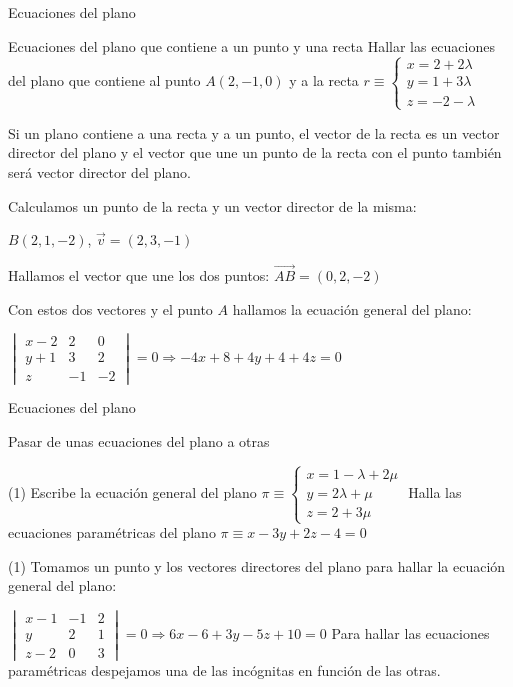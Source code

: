 \documentclass[8pt]{beamer}
\begin{document}
\begin{frame}[t]{Ecuaciones del plano}
\begin{exampleblock}{Ecuaciones del plano que contiene a un punto y una recta}
Hallar las ecuaciones del plano que contiene al punto $A(2,-1,0)$ y a la recta $r \equiv \begin{cases} x= 2 + 2 \lambda \\ y= 1+3\lambda \\ z= -2-\lambda \end{cases}$
\end{exampleblock}

Si un plano contiene a una recta y a un punto, el vector de la recta es un vector director del plano y el vector que une un punto de la recta con el punto también será vector director del plano.

Calculamos un punto de la recta y un vector director de la misma:

$B(2,1,-2)$, $\vec{v}=(2,3,-1)$

Hallamos el vector que une los dos puntos: $\vec{AB}=(0,2,-2)$

Con estos dos vectores y el punto $A$ hallamos la ecuación general del plano:

$\begin{vmatrix}
x-2 & 2 & 0 \\ y+1 & 3 & 2 \\ z & -1 & -2 
\end{vmatrix}=0 \Rightarrow -4x+8+4y+4+4z=0$
\end{frame}

\begin{frame}[t]{Ecuaciones del plano}
\begin{exampleblock}{Pasar de unas ecuaciones del plano a otras}
\begin{tasks}[label=\alph*)](1)
\task Escribe la ecuación general del plano $\pi \equiv \begin{cases} x= 1-\lambda +2 \mu \\ y=2\lambda +\mu  \\ z= 2 +3\mu \end{cases}$
\task Halla las ecuaciones paramétricas del plano $\pi \equiv x-3y+2z-4=0 $
\end{tasks}
\end{exampleblock}

\begin{tasks}[label=\alph*)](1)
\task Tomamos un punto y los vectores directores del plano para hallar la ecuación general del plano:

$\begin{vmatrix}
x-1 & -1 & 2 \\ y & 2 & 1 \\ z-2 & 0 & 3 
\end{vmatrix}=0 \Rightarrow 6x-6+3y-5z+10=0$
Para hallar las ecuaciones paramétricas despejamos una de las incógnitas en función de las otras.
\end{tasks}
\end{frame}
\end{document}
